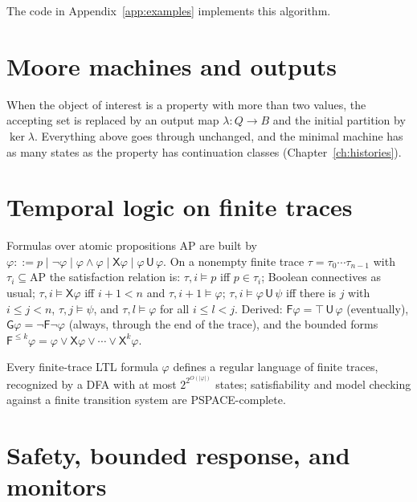 The code in Appendix~\ref{app:examples} implements this algorithm.

\section{Moore machines and outputs}

When the object of interest is a property with more than two values, the accepting set is replaced by an output map $\lambda:Q\to B$ and the initial partition by $\ker\lambda$. Everything above goes through unchanged, and the minimal machine has as many states as the property has continuation classes (Chapter~\ref{ch:histories}).

\section{Temporal logic on finite traces}

\begin{definition}\label{pc:ltl}
Formulas over atomic propositions $\mathrm{AP}$ are built by $\varphi::=p\mid\neg\varphi\mid\varphi\wedge\varphi\mid\mathsf X\varphi\mid\varphi\,\mathsf U\,\varphi$. On a nonempty finite trace $\tau=\tau_0\cdots\tau_{n-1}$ with $\tau_i\subseteq\mathrm{AP}$ the satisfaction relation is: $\tau,i\models p$ iff $p\in\tau_i$; Boolean connectives as usual; $\tau,i\models\mathsf X\varphi$ iff $i+1<n$ and $\tau,i+1\models\varphi$; $\tau,i\models\varphi\,\mathsf U\,\psi$ iff there is $j$ with $i\le j<n$, $\tau,j\models\psi$, and $\tau,l\models\varphi$ for all $i\le l<j$. Derived: $\mathsf F\varphi=\top\,\mathsf U\,\varphi$ (eventually), $\mathsf G\varphi=\neg\mathsf F\neg\varphi$ (always, through the end of the trace), and the bounded forms $\mathsf F^{\le k}\varphi=\varphi\vee\mathsf X\varphi\vee\cdots\vee\mathsf X^k\varphi$.
\end{definition}

\begin{established}\label{pc:ltl-dfa}
Every finite-trace LTL formula $\varphi$ defines a regular language of finite traces, recognized by a DFA with at most $2^{2^{O(|\varphi|)}}$ states; satisfiability and model checking against a finite transition system are PSPACE-complete.
\end{established}

\section{Safety, bounded response, and monitors}

